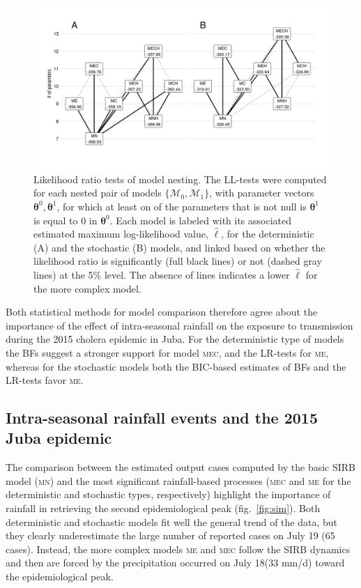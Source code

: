 \begin{figure}
    \centering
    \includegraphics[width = \textwidth, trim = 11mm 19mm 10mm 12mm, clip]{fig_cholera-rainfall/Lemaitre_ACTROP_2018_42_R1_fig3.png}
    \caption[Likelihood ratio tests of model nesting]{Likelihood ratio tests of model nesting. The LL-tests were computed for each nested pair of models $\{\mathcal{M}_0, \mathcal{M}_1\}$, with parameter vectors $\boldsymbol{\theta}^0,\boldsymbol{\theta}^1$, for which at least on of the parameters that is not null is $\boldsymbol{\theta}^1$ is equal to $0$ in $\boldsymbol{\theta}^0$. Each model is labeled with its associated estimated maximum log-likelihood value, $\hat{\ell}$, for the deterministic (A) and the stochastic (B) models, and linked based on whether the likelihood ratio is significantly (full black lines) or not (dashed gray lines) at the 5\% level. The absence of lines indicates a lower $\hat{\ell}$ for the more complex model.} 
    \label{fig:lltests}
\end{figure}


Both statistical methods for model comparison therefore agree about the importance of the effect of intra-seasonal rainfall on the exposure to transmission during the 2015 cholera epidemic in Juba. For the deterministic type of models the BFs suggest a stronger support for model \textsc{mec}, and the LR-tests for \textsc{me}, whereas for the stochastic models both the BIC-based estimates of BFs and the LR-tests favor \textsc{me}. 

\subsection{Intra-seasonal rainfall events and the 2015 Juba epidemic}

The comparison between the estimated output cases computed by the basic SIRB model (\textsc{mn}) and the most significant rainfall-based processes (\textsc{mec} and \textsc{me} for the deterministic and stochastic types, respectively) highlight the importance of rainfall in retrieving the second epidemiological peak (fig.~\ref{fig:sim}). Both deterministic and stochastic models fit well the general trend of the data, but they clearly underestimate the large number of reported cases on July 19 (65 cases). Instead, the more complex models \textsc{me} and \textsc{mec} follow the SIRB dynamics and then are forced by the precipitation occurred on July 18(33 mm/d) toward the epidemiological peak. 
%

